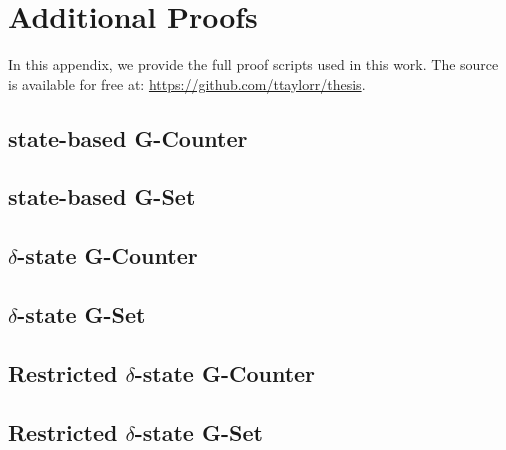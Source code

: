 \chapter{Additional Proofs}

In this appendix, we provide the full proof scripts used in this work. The
source is available for free at: \url{https://github.com/ttaylorr/thesis}.

\section{state-based G-Counter \CRDT}
\label{sec:app-gcounter-comm-assoc}


\section{state-based G-Set \CRDT}
\label{sec:app-state-gset}


\section{$\delta$-state G-Counter \CRDT}


\section{$\delta$-state G-Set \CRDT}
\label{sec:app-delta-gset}


\section{Restricted $\delta$-state G-Counter \CRDT}


\section{Restricted $\delta$-state G-Set \CRDT}

